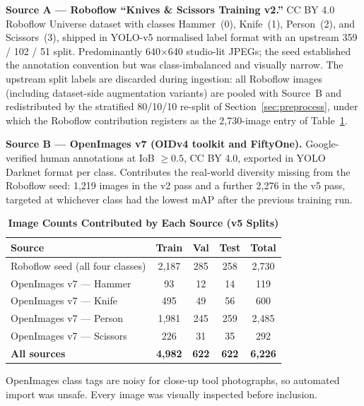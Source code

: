 \documentclass{ieeeaccess}
\begin{document}
\textbf{Source A --- Roboflow ``Knives \& Scissors Training v2.''} CC BY 4.0 Roboflow Universe dataset with classes Hammer~(0), Knife~(1), Person~(2), and Scissors~(3), shipped in YOLO-v5 normalised label format with an upstream 359 / 102 / 51 split. Predominantly 640$\times$640 studio-lit JPEGs; the seed established the annotation convention but was class-imbalanced and visually narrow. The upstream split labels are discarded during ingestion: all Roboflow images (including dataset-side augmentation variants) are pooled with Source~B and redistributed by the stratified 80/10/10 re-split of Section~\ref{sec:preprocess}, under which the Roboflow contribution registers as the 2{,}730-image entry of Table~\ref{tab:sources}.

\textbf{Source B --- OpenImages v7 (OIDv4 toolkit and FiftyOne).} Google-verified human annotations at IoB $\geq 0.5$, CC BY 4.0, exported in YOLO Darknet format per class. Contributes the real-world diversity missing from the Roboflow seed: 1{,}219 images in the v2 pass and a further 2{,}276 in the v5 pass, targeted at whichever class had the lowest mAP after the previous training run.

\begin{table}[ht!]
\caption{\textbf{Image Counts Contributed by Each Source (v5 Splits)}}
\label{tab:sources}
\setlength{\tabcolsep}{3pt}
\centering\small
\begin{tabular}{|l|c|c|c|c|}
\hline
\textbf{Source} & \textbf{Train} & \textbf{Val} & \textbf{Test} & \textbf{Total} \\
\hline
Roboflow seed (all four classes)     & 2{,}187 & 285 & 258 & 2{,}730 \\
OpenImages v7 --- Hammer             & 93      & 12  & 14  & 119   \\
OpenImages v7 --- Knife              & 495     & 49  & 56  & 600   \\
OpenImages v7 --- Person             & 1{,}981 & 245 & 259 & 2{,}485 \\
OpenImages v7 --- Scissors           & 226     & 31  & 35  & 292   \\
\hline
\textbf{All sources}                 & \textbf{4{,}982} & \textbf{622} & \textbf{622} & \textbf{6{,}226} \\
\hline
\end{tabular}
\end{table}

OpenImages class tags are noisy for close-up tool photographs, so automated import was unsafe. Every image was visually inspected before inclusion.
\end{document}
